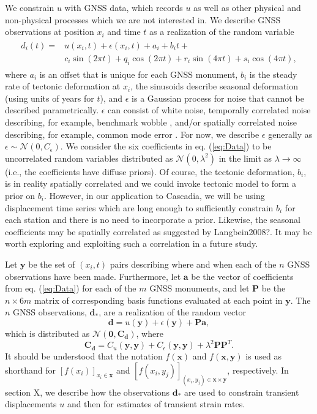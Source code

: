 \documentclass[10pt,a4paper]{article}
\begin{document}
We constrain $u$ with GNSS data, which records $u$ as well as other physical and non-physical processes which we are not interested in. We describe GNSS observations at position $x_i$ and time $t$ as a realization of the random variable 
\begin{align}\label{eq:Data}
\begin{split}
d_{i}(t) = &u(x_i,t) + \epsilon(x_i,t) + a_{i} + b_{i}t + \\
         &c_{i}\sin(2 \pi t) + q_{i}\cos(2 \pi t) + r_{i}\sin(4 \pi t) + s_{i}\cos(4 \pi t), 
\end{split}
\end{align}
where $a_{i}$ is an offset that is unique for each GNSS monument, $b_{i}$ is the steady rate of tectonic deformation at $x_i$, the sinusoids describe seasonal deformation (using units of years for $t$), and $\epsilon$ is a Gaussian process for noise that cannot be described parametrically.  $\epsilon$ can consist of white noise, temporally correlated noise describing, for example, benchmark wobble \citep[e.g.,][]{Wyatt1982,Wyatt1989}, and/or spatially correlated noise describing, for example, common mode error \citep[e.g.,][]{Wdowinski1997}.  For now, we describe $\epsilon$ generally as $\epsilon \sim \mathcal{N}(0,C_\epsilon)$. We consider the six coefficients in eq. (\ref{eq:Data}) to be uncorrelated random variables distributed as $\mathcal{N}(0,\lambda^2)$ in the limit as $\lambda \to \infty$ (i.e., the coefficients have diffuse priors). Of course, the tectonic deformation, $b_{i}$, is in reality spatially correlated and we could invoke tectonic model to form a prior on $b_{i}$. However, in our application to Cascadia, we will be using displacement time series which are long enough to sufficiently constrain $b_{i}$ for each station and there is no need to incorporate a prior. Likewise, the seasonal coefficients may be spatially correlated as suggested by Langbein2008?. It may be worth exploring and exploiting such a correlation in a future study. 

Let $\bm{y}$ be the set of $(x_i, t)$ pairs describing where and when each of the $n$ GNSS observations have been made. Furthermore, let $\bm{a}$ be the vector of coefficients from eq. (\ref{eq:Data}) for each of the $m$ GNSS monuments, and let $\bm{P}$ be the $n \times 6m$ matrix of corresponding basis functions evaluated at each point in $\bm{y}$. The $n$ GNSS observations, $\bm{d}_*$, are a realization of the random vector
\begin{equation}
\bm{d} = u(\bm{y}) + \epsilon(\bm{y}) + \bm{P}\bm{a},
\end{equation}
which is distributed as $\mathcal{N}(\bm{0},\bm{C_d})$, where
\begin{equation}\label{eq:Cd}
\bm{C_d} = C_u(\bm{y},\bm{y}) + C_\epsilon(\bm{y},\bm{y}) + 
           \lambda^2\bm{P}\bm{P}^T.
\end{equation}
It should be understood that the notation $f(\bm{x})$ and $f(\bm{x},\bm{y})$ is used as shorthand for $[f(x_i)]_{x_i \in \bm{x}}$ and $[f(x_i,y_j)]_{(x_i,y_j) \in \bm{x} \times \bm{y}}$, respectively. In section X, we describe how the observations $\bm{d}_*$ are used to constrain transient displacements $u$ and then for estimates of transient strain rates.
\end{document}
